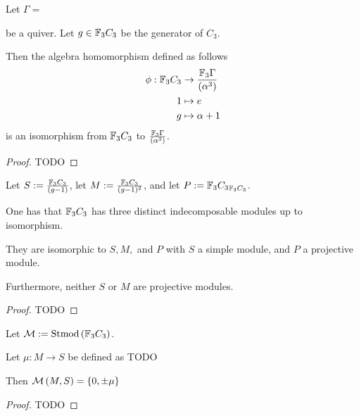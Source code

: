 \begin{lemma}
    Let \( \Gamma = \)
    be a quiver.
    Let \( g \in {\mathbb{F}}_3 C_3 \) be the generator of \( C_3 \).
    
    Then the algebra homomorphism defined as follows
    \begin{align*}
        \phi: {\mathbb{F}}_3 C_3 &\to \frac{{\mathbb{F}}_3\Gamma}{(\alpha^3)} \\
        1 &\mapsto e \\
        g &\mapsto \alpha + 1
    \end{align*}
    is an isomorphism from \( {\mathbb{F}}_3 C_3 \) to \( \frac{{\mathbb{F}}_3\Gamma}{(\alpha^3)} \).    
\end{lemma}
\begin{proof}
    TODO
\end{proof}

\begin{definition}
    Let \( S := \frac{{\mathbb{F}}_3C_3}{(g - 1)} \), let \( M := \frac{{\mathbb{F}}_3C_3}{(g - 1)^2} \), and let \( P := {{\mathbb{F}}_3C_3}_{{\mathbb{F}}_3C_3} \).
\end{definition}

\begin{lemma}
    One has that \( {\mathbb{F}}_3 C_3 \) has three distinct indecomposable modules up to isomorphism.
    
    They are isomorphic to \( S, M, \) and \( P \) with \( S \) a simple module, and \( P \) a projective module.

    Furthermore, neither \( S \) or \( M \) are projective modules.
\end{lemma}
\begin{proof}
    TODO
\end{proof}

\begin{definition}
    Let \( {\mathcal{M}} := \operatorname{Stmod}\left(  {\mathbb{F}}_3C_3  \right) \).
\end{definition}

\begin{lemma} \label{thm:f_3c_3_mu}
    Let \( \mu: M \to S \) be defined as TODO

    Then \( {\mathcal{M}}\left( M, S \right) = \left\{ 0, \pm\mu \right\} \)
\end{lemma}
\begin{proof}
    TODO
\end{proof}

